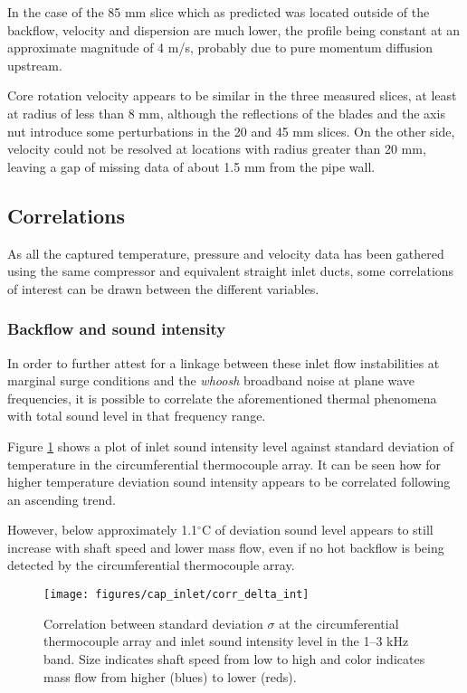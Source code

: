 In the case of the 85 mm slice which as predicted was located outside of the backflow, velocity and dispersion are much lower, the profile being constant at an approximate magnitude of 4 m/s, probably due to pure momentum diffusion upstream.

Core rotation velocity appears to be similar in the three measured slices, at least at radius of less than 8 mm, although the reflections of the blades and the axis nut introduce some perturbations in the 20 and 45 mm slices. On the other side, velocity could not be resolved at locations with radius greater than 20 mm, leaving a gap of missing data of about 1.5 mm from the pipe wall.

\subsection{Correlations}

As all the captured temperature, pressure and velocity data has been gathered using the same compressor and equivalent straight inlet ducts, some correlations of interest can be drawn between the different variables.

\subsubsection{Backflow and sound intensity}

In order to further attest for a linkage between these inlet flow instabilities at marginal surge conditions and the \emph{whoosh} broadband noise at plane wave frequencies, it is possible to correlate the aforementioned thermal phenomena with total sound level in that frequency range.

Figure \ref{fig:corr1} shows a plot of inlet sound intensity level against standard deviation of temperature in the circumferential thermocouple array. It can be seen how for higher temperature deviation sound intensity appears to be correlated following an ascending trend.

However, below approximately 1.1$^{\circ}$C of deviation sound level appears to still increase with shaft speed and lower mass flow, even if no hot backflow is being detected by the circumferential thermocouple array.

\begin{figure}[htb!]
\centering
\texttt{[image: figures/cap\_inlet/corr\_delta\_int]}
\caption[Correlation between $\sigma$ temp. and SIL]{Correlation between standard deviation $\sigma$ at the circumferential thermocouple array and inlet sound intensity level in the 1--3 kHz band. Size indicates shaft speed from low to high and color indicates mass flow from higher (blues) to lower (reds).}
\label{fig:corr1}
\end{figure}

